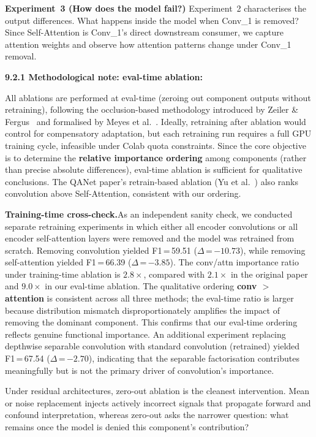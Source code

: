 \documentclass[10pt]{article}
\newcommand{\FieldLabel}[1]{%
 {\bfseries #1:}\par
}
\begin{document}
\textbf{Experiment~3 (How does the model fail?)} Experiment~2 characterises the output differences. What happens inside the model when Conv\_1 is removed? Since Self-Attention is Conv\_1's direct downstream consumer, we capture attention weights and observe how attention patterns change under Conv\_1 removal.

\FieldLabel{9.2.1 Methodological note: eval-time ablation}

All ablations are performed at eval-time (zeroing out component outputs without retraining), following the occlusion-based methodology introduced by Zeiler \& Fergus~\cite{zeiler2014visualizing} and formalised by Meyes et al.~\cite{meyes2019ablation}. Ideally, retraining after ablation would control for compensatory adaptation, but each retraining run requires a full GPU training cycle, infeasible under Colab quota constraints. Since the core objective is to determine the \textbf{relative importance ordering} among components (rather than precise absolute differences), eval-time ablation is sufficient for qualitative conclusions. The QANet paper's retrain-based ablation (Yu et al.~\cite{yu2018qanet}) also ranks convolution above Self-Attention, consistent with our ordering.

\textbf{Training-time cross-check.}\quad As an independent sanity check, we conducted separate retraining experiments in which either all encoder convolutions or all encoder self-attention layers were removed and the model was retrained from scratch. Removing convolution yielded F1\,=\,59.51 ($\Delta$\,=\,$-10.73$), while removing self-attention yielded F1\,=\,66.39 ($\Delta$\,=\,$-3.85$). The conv/attn importance ratio under training-time ablation is $2.8\times$, compared with $2.1\times$ in the original paper and $9.0\times$ in our eval-time ablation. The qualitative ordering \textbf{conv $>$ attention} is consistent across all three methods; the eval-time ratio is larger because distribution mismatch disproportionately amplifies the impact of removing the dominant component. This confirms that our eval-time ordering reflects genuine functional importance. An additional experiment replacing depthwise separable convolution with standard convolution (retrained) yielded F1\,=\,67.54 ($\Delta$\,=\,$-2.70$), indicating that the separable factorisation contributes meaningfully but is not the primary driver of convolution's importance.

Under residual architectures, zero-out ablation is the cleanest intervention. Mean or noise replacement injects actively incorrect signals that propagate forward and confound interpretation, whereas zero-out asks the narrower question: what remains once the model is denied this component's contribution?
\end{document}
